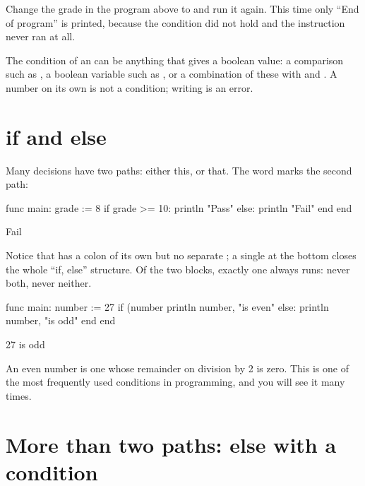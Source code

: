 Change the grade in the program above to  and run it again. This
time only ``End of program'' is printed, because the condition did not hold
and the instruction  never ran at all.

\begin{note}
The condition of an  can be anything that gives a boolean value: a
comparison such as , a boolean variable such as
, or a combination of these with  and
. A number on its own is not a condition; writing 
is an error.
\end{note}

\section{if and else}

Many decisions have two paths: either this, or that. The word 
marks the second path:

\begin{salamcode}
func main:
    grade := 8
    if grade >= 10:
        println "Pass"
    else:
        println "Fail"
    end
end
\end{salamcode}

\begin{salamout}
Fail
\end{salamout}

Notice that  has a colon of its own but no separate ;
a single  at the bottom closes the whole ``if, else'' structure.
Of the two blocks, exactly one always runs: never both, never neither.

\begin{salamcode}
func main:
    number := 27
    if (number %
        println number, "is even"
    else:
        println number, "is odd"
    end
end
\end{salamcode}

\begin{salamout}
27 is odd
\end{salamout}

An even number is one whose remainder on division by 2 is zero. This is one
of the most frequently used conditions in programming, and you will see it
many times.

\section{More than two paths: else with a condition}


